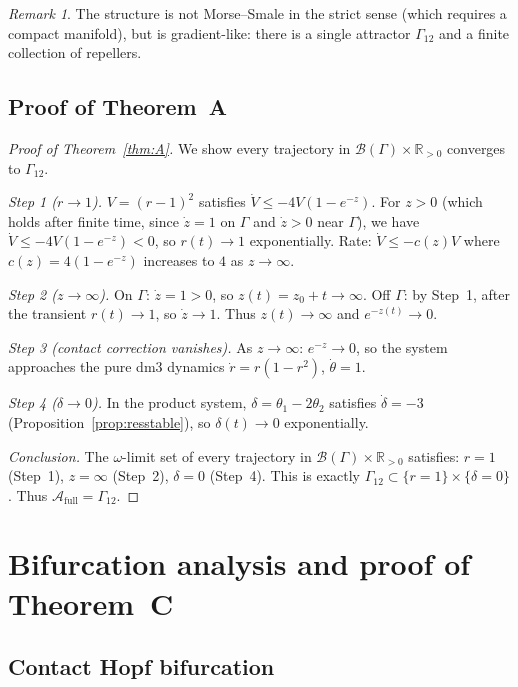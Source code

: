 \documentclass[12pt, oneside]{book}
\theoremstyle{plain}
\theoremstyle{definition}
\theoremstyle{remark}
\newtheorem{remark}{Remark}[section]
\newcommand{\R}{\mathbb{R}}
\newcommand{\Orb}{\Gamma}
\newcommand{\cB}{\mathcal{B}}
\begin{document}
\begin{remark}
The structure is not Morse--Smale in the strict sense (which requires
a compact manifold), but is gradient-like: there is a single attractor
$\Orb_{12}$ and a finite collection of repellers.
\end{remark}

\subsection{Proof of Theorem~A}

\begin{proof}[Proof of Theorem~\ref{thm:A}]
We show every trajectory in $\cB(\Orb)\times\R_{>0}$ converges to
$\Orb_{12}$.

\emph{Step 1 ($r\to 1$).}
$V=(r-1)^2$ satisfies $\dot V\le-4V(1-e^{-z})$.
For $z>0$ (which holds after finite time, since $\dot z=1$ on $\Orb$
and $\dot z>0$ near $\Orb$), we have $\dot V\le-4V(1-e^{-z})<0$,
so $r(t)\to 1$ exponentially. Rate: $\dot V\le-c(z)V$ where
$c(z)=4(1-e^{-z})$ increases to $4$ as $z\to\infty$.

\emph{Step 2 ($z\to\infty$).}
On $\Orb$: $\dot z=1>0$, so $z(t)=z_0+t\to\infty$.
Off $\Orb$: by Step~1, after the transient $r(t)\to 1$, so
$\dot z\to 1$. Thus $z(t)\to\infty$ and $e^{-z(t)}\to 0$.

\emph{Step 3 (contact correction vanishes).}
As $z\to\infty$: $e^{-z}\to 0$, so the system approaches the
pure dm3 dynamics $\dot r=r(1-r^2)$, $\dot\theta=1$.

\emph{Step 4 ($\delta\to 0$).}
In the product system, $\delta=\theta_1-2\theta_2$ satisfies
$\dot\delta=-3$ (Proposition~\ref{prop:resstable}), so
$\delta(t)\to 0$ exponentially.

\emph{Conclusion.}
The $\omega$-limit set of every trajectory in $\cB(\Orb)\times\R_{>0}$
satisfies: $r=1$ (Step~1), $z=\infty$ (Step~2), $\delta=0$ (Step~4).
This is exactly $\Orb_{12}\subset\{r=1\}\times\{\delta=0\}$.
Thus $\mathcal{A}_{\mathrm{full}}=\Orb_{12}$.
\end{proof}

\section{Bifurcation analysis and proof of Theorem~C}\label{sec:bifurcations}

\subsection{Contact Hopf bifurcation}
\end{document}
